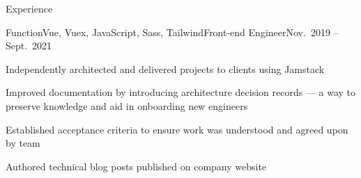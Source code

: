 \documentclass{resume} %
\begin{document}
\begin{rSection}{Experience}

\begin{rSubsection}{Function}{Vue, Vuex, JavaScript, Sass, Tailwind}{Front-end Engineer}{Nov.\ 2019 – Sept.\ 2021}
\item Independently architected and delivered projects to clients using Jamstack
\item Improved documentation by introducing architecture decision records --- a way to preserve knowledge and aid in onboarding new engineers
\item Established acceptance criteria to ensure work was understood and agreed upon by team
\item Authored technical blog posts published on company website
 \end{rSubsection}









\end{rSection}

\end{document}
